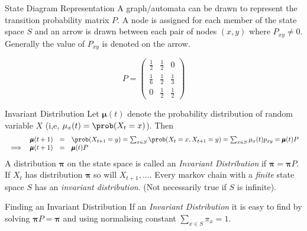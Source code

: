 \documentclass[11pt,a4paper]{article}
\begin{document}
\begin{proposition}{State Diagram Representation}
  A graph/automata can be drawn to represent the transition probability matrix $P$. A node is assigned for each member of the state space $S$ and an arrow is drawn between each pair of nodes $(x,y)$ where $P_{xy}\neq0$. Generally the value of $P_{xy}$ is denoted on the arrow.
  \begin{center}
    \[P=\begin{pmatrix}\frac{1}{2}&\frac{1}{2}&0\\\frac{1}{6}&\frac{1}{2}&\frac{1}{3}\\0&\frac{1}{2}&\frac{1}{2}\end{pmatrix}\]
  \end{center}
\end{proposition}

\begin{definition}{Invariant Distribution}
  Let $\pmb\mu(t)$ denote the probability distribution of random variable $X$ (i,e, $\mu_x(t)=\prob(X_t=x)$). Then
  \[\begin{array}{rrcl}
    &\pmb\mu(t+1)&=&\prob(X_{t+1}=y)=\sum_{x\in S}\prob(X_t=x,X_{t+1}=y)=\sum_{x\in S}\mu_x(t)p_{xy}=\pmb\mu(t)P\\
    \implies&\pmb\mu(t+1)&=&\pmb\mu(t)P
  \end{array}\]
  A distribution $\pmb\pi$ on the state space is called an \textit{Invariant Distribution} if $\pmb\pi=\pmb\pi P$. If $X_t$ has distribution $\pmb\pi$ so will $X_{t+1},\dots$. Every markov chain with a \textit{finite} state space $S$ has an \textit{invariant distribution}. (Not necessarily true if $S$ is infinite).
\end{definition}

\begin{proposition}{Finding an Invariant Distribution}
  If an \textit{Invariant Distribution} it is easy to find by solving $\pmb\pi P=\pmb\pi$ and using normalising constant $\sum_{x\in S}\pi_x=1$.
\end{proposition}
\end{document}
